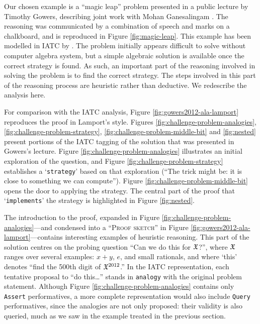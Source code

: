 \documentclass[smallextended,oneside]{svjour3}       %
\newcommand\nothing[1]{#1}
\let\paragraph\nothing
\begin{document}
\paragraph{Our chosen example is a ``magic leap'' problem presented in a public lecture by Timothy Gowers, describing joint work with Mohan Ganesalingam \citeyearpar{gowers-talk}.}
The reasoning was communicated by a combination of speech and marks
on a chalkboard, and is reproduced in Figure \ref{fig:magic-leap}.
This example has been modelled in IATC by \citet{corneli2017modelling}.
The problem initially appears difficult to solve without computer algebra
system, but a simple algebraic solution is available
once the correct strategy is found.  As such, an
important part of the reasoning involved in solving the problem is to
find the correct strategy.  The steps involved in this part of the
reasoning process are heuristic rather than deductive.  We redescribe
the analysis here.

\paragraph{For comparison with the IATC analysis, Figure \ref{fig:gowers2012-ala-lamport} reproduces the proof in Lamport's style. Figures \ref{fig:challenge-problem-analogies}, \ref{fig:challenge-problem-strategy}, \ref{fig:challenge-problem-middle-bit}
and \ref{fig:nested} present portions of the IATC tagging of the solution that was presented in Gowers's lecture.}
Figure \ref{fig:challenge-problem-analogies} illustrates an initial
exploration of the question, and Figure
\ref{fig:challenge-problem-strategy} establishes a `\texttt{strategy}'
based on that exploration (``The trick might be: it is close to
something we can compute'').
Figure \ref{fig:challenge-problem-middle-bit} opens the door to
applying the strategy.
The central part of the proof that `\texttt{implements}' the strategy
is highlighted in Figure \ref{fig:nested}.

\paragraph{The introduction to the proof, expanded in Figure \ref{fig:challenge-problem-analogies}---and condensed into a ``{\scshape Proof sketch}'' in Figure \ref{fig:gowers2012-ala-lamport}---contains interesting examples of heuristic reasoning.}
This part of the solution centres on the probing question ``Can we do
this for $\frak{X}$?'', where $\frak{X}$ ranges over several examples:
$x+y$, $e$, and small rationals, and where `this' denotes ``find the
500th digit of $\frak{X}^{2012}$.''  In the IATC representation, each
tentative proposal to ``do this\ldots'' stands in \texttt{analogy}
with the original problem statement.  Although Figure
\ref{fig:challenge-problem-analogies} contains only \texttt{Assert}
performatives, a more complete representation would also include
\texttt{Query} performatives, since the analogies are not only
proposed: their validity is also queried, much as we saw in the
example treated in the previous section.
\end{document}
